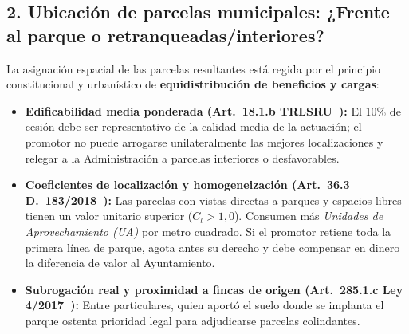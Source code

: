 \documentclass[11pt,a4paper]{article}
\begin{document}
\subsection{2. Ubicación de parcelas municipales: ¿Frente al parque o retranqueadas/interiores?}
La asignación espacial de las parcelas resultantes está regida por el principio constitucional y urbanístico de \textbf{equidistribución de beneficios y cargas}:
\begin{itemize}
  \item \textbf{Edificabilidad media ponderada (Art.~18.1.b TRLSRU~\cite{trlsru2015}):} El 10\% de cesión debe ser representativo de la calidad media de la actuación; el promotor no puede arrogarse unilateralmente las mejores localizaciones y relegar a la Administración a parcelas interiores o desfavorables.
  \item \textbf{Coeficientes de localización y homogeneización (Art.~36.3 D.~183/2018~\cite{decreto183_2018_canarias}):} Las parcelas con vistas directas a parques y espacios libres tienen un valor unitario superior ($C_l > 1,0$). Consumen más \textit{Unidades de Aprovechamiento (UA)} por metro cuadrado. Si el promotor retiene toda la primera línea de parque, agota antes su derecho y debe compensar en dinero la diferencia de valor al Ayuntamiento.
  \item \textbf{Subrogación real y proximidad a fincas de origen (Art.~285.1.c Ley 4/2017~\cite{ley4_2017_canarias}):} Entre particulares, quien aportó el suelo donde se implanta el parque ostenta prioridad legal para adjudicarse parcelas colindantes.
\end{itemize}
\end{document}
